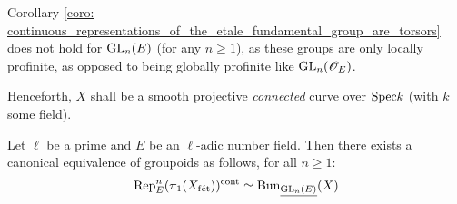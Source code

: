         \begin{remark}
            Corollary \ref{coro: continuous_representations_of_the_etale_fundamental_group_are_torsors} does not hold for $\operatorname{GL}_n(E)$ (for any $n \geq 1$), as these groups are only locally profinite, as opposed to being globally profinite like $\operatorname{GL}_n(\mathscr{O}_E)$.
        \end{remark}
    
        \begin{convention} \label{conv: base_curve}
            Henceforth, $X$ shall be a smooth projective \textit{connected} curve over $\mathrm{Spec} k$ (with $k$ some field).
        \end{convention}
        
        \begin{proposition} \label{prop: E_representations_are_E_local_systems}
            Let $\ell$ be a prime and $E$ be an $\ell$-adic number field. Then there exists a canonical equivalence of groupoids as follows, for all $n \geq 1$:
                $$\mathrm{Rep}_E^n(\pi_1(X_{\mathrm{f\acute{e}t}}))^{\mathrm{cont}} \simeq \mathrm{Bun}_{\underline{\operatorname{GL}_n(E)}}(X)$$
        \end{proposition}
